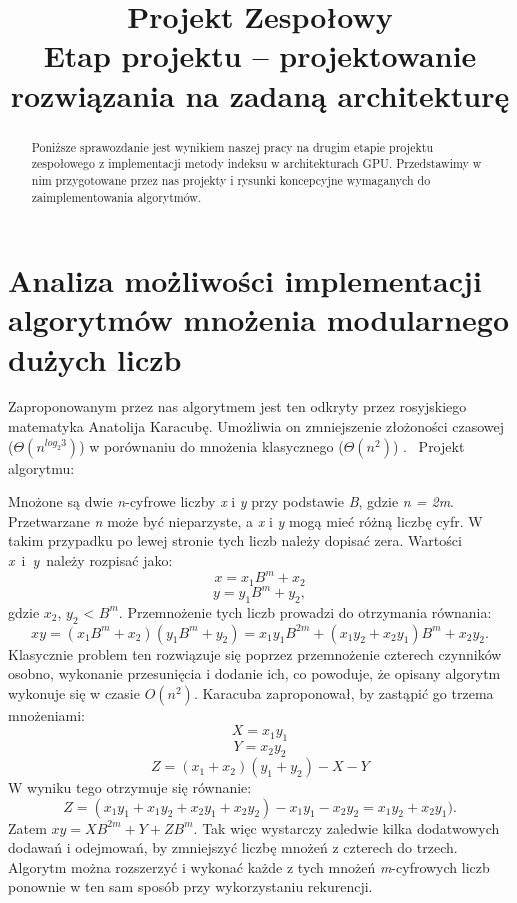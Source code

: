 \documentclass[]{article}
\title{Projekt Zespołowy \\
	Etap projektu – projektowanie rozwiązania na zadaną architekturę}
\author{}
\date{}
\begin{document}
\maketitle

\begin{abstract}

Poniższe sprawozdanie jest wynikiem naszej pracy na drugim etapie projektu zespołowego z implementacji metody indeksu w architekturach GPU. Przedstawimy w nim przygotowane przez nas projekty i rysunki koncepcyjne wymaganych do zaimplementowania algorytmów.



\end{abstract}

\section{Analiza możliwości implementacji algorytmów mnożenia modularnego dużych liczb}
Zaproponowanym przez nas algorytmem jest ten odkryty przez rosyjskiego matematyka Anatolija Karacubę. Umożliwia on zmniejszenie złożoności czasowej ($\Theta(n^{log_{2}3})$) w porównaniu do mnożenia klasycznego ($\Theta(n^2)$) .
\newline\newline
~Projekt algorytmu:\newline

Mnożone są dwie \textit{n}-cyfrowe liczby \textit{x} i \textit{y} przy podstawie \textit{B}, gdzie \textit{n = 2m}. Przetwarzane \textit{n} może być nieparzyste, a \textit{x} i \textit{y} mogą mieć różną liczbę cyfr. W takim przypadku po lewej stronie tych liczb należy dopisać zera. Wartości \textit{x}~i~\textit{y}~należy rozpisać jako:\newline
$$ x = x_{1}B^{m} + x_2 $$
$$ y = y_{1}B^{m} + y_2, $$
gdzie $x_2$, $y_2$ < $B^m$. \newline
Przemnożenie tych liczb prowadzi do otrzymania równania:
$$xy = (x_{1}B^{m} + x_2)(y_1B^m + y_2) = x_1y_1B^{2m} + (x_1y_2 + x_2y_1)B^m + x_2y_2.$$ 
Klasycznie problem ten rozwiązuje się poprzez przemnożenie czterech czynników osobno, wykonanie przesunięcia i dodanie ich, co powoduje, że opisany algorytm wykonuje się w czasie $\textit{O}(n^{2})$. Karacuba zaproponował, by zastąpić go trzema mnożeniami:
$$X = x_1y_1$$
$$Y = x_2y_2$$
$$Z = (x_1 + x_2)(y_1 + y_2) - X - Y$$
W wyniku tego otrzymuje się równanie:
$$ Z = (x_1y_1 + x_1y_2 + x_2y_1 + x_2y_2) - x_1y_1 - x_2y_2 = x_1y_2 + x_2y_1).$$
Zatem $xy = XB^{2m} + Y + ZB^m$. Tak więc wystarczy zaledwie kilka dodatwowych dodawań i odejmowań, by zmniejszyć liczbę mnożeń z czterech do trzech.\newline
Algorytm można rozszerzyć i wykonać każde z tych mnożeń \textit{m}-cyfrowych liczb ponownie w ten sam sposób przy wykorzystaniu rekurencji.
\end{document}
